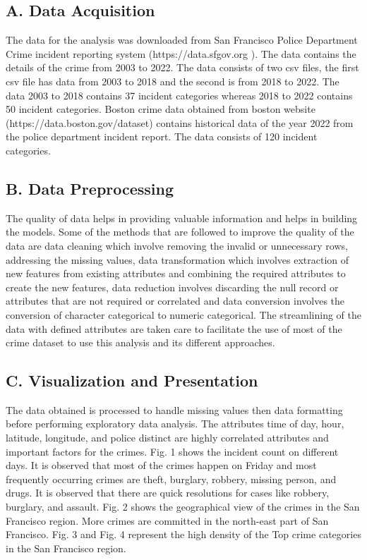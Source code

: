 \documentclass[conference,final, 10pt]{IEEEtran}
\begin{document}
\subsection{A. Data Acquisition}\label{a.-data-acquisition}

The data for the analysis was downloaded from San Francisco Police
Department Crime incident reporting system (https://data.sfgov.org ).
The data contains the details of the crime from 2003 to 2022. The data
consists of two csv files, the first csv file has data from 2003 to 2018
and the second is from 2018 to 2022. The data 2003 to 2018 contains 37
incident categories whereas 2018 to 2022 contains 50 incident
categories. Boston crime data obtained from boston website
(https://data.boston.gov/dataset) contains historical data of the year
2022 from the police department incident report. The data consists of
120 incident categories.

\subsection{B. Data Preprocessing}\label{b.-data-preprocessing}

The quality of data helps in providing valuable information and helps in
building the models. Some of the methods that are followed to improve
the quality of the data are data cleaning which involve removing the
invalid or unnecessary rows, addressing the missing values, data
transformation which involves extraction of new features from existing
attributes and combining the required attributes to create the new
features, data reduction involves discarding the null record or
attributes that are not required or correlated and data conversion
involves the conversion of character categorical to numeric categorical.
The streamlining of the data with defined attributes are taken care to
facilitate the use of most of the crime dataset to use this analysis and
its different approaches.

\subsection{C. Visualization and
Presentation}\label{c.-visualization-and-presentation}

The data obtained is processed to handle missing values then data
formatting before performing exploratory data analysis. The attributes
time of day, hour, latitude, longitude, and police distinct are highly
correlated attributes and important factors for the crimes. Fig. 1 shows
the incident count on different days. It is observed that most of the
crimes happen on Friday and most frequently occurring crimes are theft,
burglary, robbery, missing person, and drugs. It is observed that there
are quick resolutions for cases like robbery, burglary, and assault.
Fig. 2 shows the geographical view of the crimes in the San Francisco
region. More crimes are committed in the north-east part of San
Francisco. Fig. 3 and Fig. 4 represent the high density of the Top crime
categories in the San Francisco region.
\end{document}

